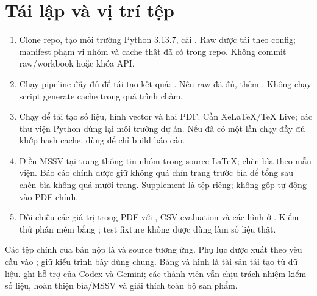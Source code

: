 \documentclass[11pt,a4paper]{article}
\begin{document}
\section{Tái lập và vị trí tệp}
\begin{enumerate}
\item Clone repo, tạo môi trường Python 3.13.7, cài . Raw được tải theo config; manifest phạm vi nhóm và cache thật đã có trong repo. Không commit raw/workbook hoặc khóa API.
\item Chạy pipeline đầy đủ để tái tạo kết quả: . Nếu raw đã đủ, thêm . Không chạy script generate cache trong quá trình chấm.
\item Chạy  để tái tạo số liệu, hình vector và hai PDF. Cần XeLaTeX/TeX Live; các thư viện Python dùng lại môi trường dự án. Nếu đã có một lần chạy đầy đủ khớp hash cache, dùng  để chỉ build báo cáo.
\item Điền MSSV tại trang thông tin nhóm trong source LaTeX; chèn bìa theo mẫu viện. Báo cáo chính được giữ không quá chín trang trước bìa để tổng sau chèn bìa không quá mười trang. Supplement là tệp riêng; không gộp tự động vào PDF chính.
\item Đối chiếu các giá trị trong PDF với , CSV evaluation và các hình ở . Kiểm thử phần mềm bằng ; test fixture không được dùng làm số liệu thật.
\end{enumerate}

Các tệp chính của bản nộp là  và source tương ứng. Phụ lục được xuất theo yêu cầu vào ;  giữ kiểu trình bày dùng chung. Bảng và hình là tài sản tái tạo từ dữ liệu.  ghi hỗ trợ của Codex và Gemini; các thành viên vẫn chịu trách nhiệm kiểm số liệu, hoàn thiện bìa/MSSV và giải thích toàn bộ sản phẩm.
\end{document}
